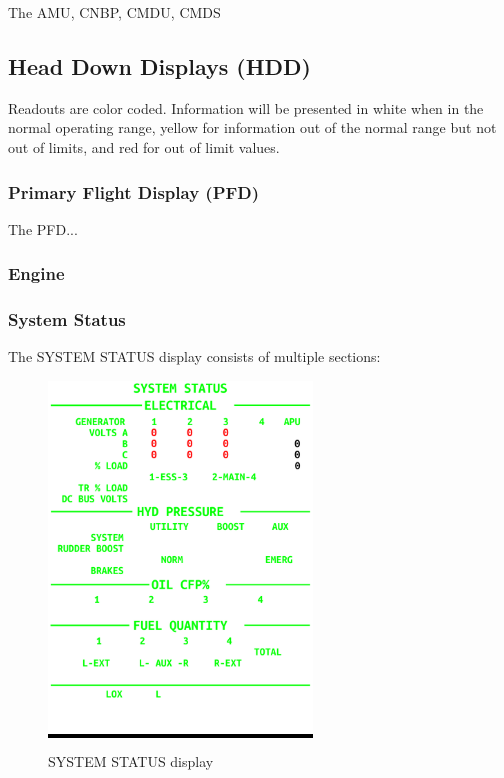 The \gls{AMU}, \gls{CNBP}, \gls{CMDU}, \gls{CMDS}

\subsection{Head Down Displays (HDD)}
\label{sec:hdd}

Readouts are color coded. Information will be presented in white when in the normal operating range, yellow for information out of the normal range but not out of limits, and red for out of limit values.

\newpage
\subsubsection{Primary Flight Display (PFD)}
\label{sec:pfd}

The \gls{PFD}...

\subsubsection{Engine}

\newpage
\subsubsection{System Status}

The SYSTEM STATUS display consists of multiple sections:

\begin{figure}[h]
  \centering
  \colorbox{black}{\includegraphics[width=7cm]{figures/hdd/SYSTEM-STATUS}}
  \caption{SYSTEM STATUS display}
\end{figure}

